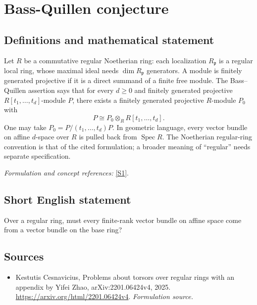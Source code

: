 \documentclass[11pt]{article}
\begin{document}
\section*{\texorpdfstring{Bass-Quillen conjecture}{Bass-Quillen conjecture}}\label{312}
\subsection{Definitions and mathematical statement}
Let $R$ be a commutative regular Noetherian ring: each localization $R_{\mathfrak p}$ is a regular local ring, whose maximal ideal needs $\dim R_{\mathfrak p}$ generators. A module is finitely generated projective if it is a direct summand of a finite free module. The Bass--Quillen assertion says that for every $d\ge0$ and finitely generated projective $R[t_1,\ldots,t_d]$-module $P$, there exists a finitely generated projective $R$-module $P_0$ with
\[
 P\cong P_0\otimes_R R[t_1,\ldots,t_d].
\]
One may take $P_0=P/(t_1,\ldots,t_d)P$. In geometric language, every vector bundle on affine $d$-space over $R$ is pulled back from $\operatorname{Spec}R$. The Noetherian regular-ring convention is that of the cited formulation; a broader meaning of ``regular'' needs separate specification.
\par\smallskip\textit{Formulation and concept references:} \href{https://arxiv.org/html/2201.06424v4}{[S1]}.

\subsection{Short English statement}
Over a regular ring, must every finite-rank vector bundle on affine space come from a vector bundle on the base ring?
\subsection{Sources}
\begin{itemize}
\item[S1]Kestutis Cesnavicius, Problems about torsors over regular rings with an appendix by Yifei Zhao, arXiv:2201.06424v4, 2025.
\url{https://arxiv.org/html/2201.06424v4}.
\textit{Formulation source.}
\end{itemize}
\end{document}
